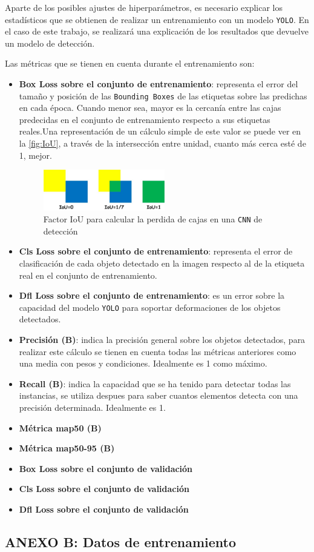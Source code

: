 \clearpage
Aparte de los posibles ajustes de hiperparámetros, es necesario explicar los estadísticos que se obtienen de realizar un entrenamiento con un modelo \texttt{YOLO}. En el caso de este trabajo, se realizará una 
explicación de los resultados que devuelve un modelo de detección.

Las métricas que se tienen en cuenta durante el entrenamiento son:

\begin{itemize}
    \item \textbf{Box Loss sobre el conjunto de entrenamiento}: representa el error del tamaño y posición de las \texttt{Bounding Boxes} de las etiquetas sobre las predichas en cada época. Cuando menor sea, 
    mayor es la cercanía entre las cajas predecidas en el conjunto de entrenamiento respecto a sus etiquetas reales.\newline Una representación de un cálculo simple de este valor se puede ver en la \autoref{fig:IoU}, a través de la 
    intersección entre unidad, cuanto más cerca esté de 1, mejor.

    \begin{figure}[H]
        \centering
        \includegraphics[width=0.5\textwidth]{images/13/a/IoU.png}
        \caption{Factor IoU para calcular la perdida de cajas en una \texttt{CNN} de detección}
        \label{fig:IoU}
    \end{figure}
    \item \textbf{Cls Loss sobre el conjunto de entrenamiento}: representa el error de clasificación de cada objeto detectado en la imagen respecto al de la etiqueta real en el conjunto de entrenamiento.
    \item \textbf{Dfl Loss sobre el conjunto de entrenamiento}: es un error sobre la capacidad del modelo \texttt{YOLO} para soportar deformaciones de los objetos detectados.
    \item \textbf{Precisión (B)}: indica la precisión general sobre los objetos detectados, para realizar este cálculo se tienen en cuenta todas las métricas anteriores como una media con pesos y condiciones. Idealmente es 1 como máximo.
    \item \textbf{Recall (B)}: indica la capacidad que se ha tenido para detectar todas las instancias, se utiliza despues para saber cuantos elementos detecta con una precisión determinada. Idealmente es 1.
    \item \textbf{Métrica \acrshort{map}50 (B)}
    \item \textbf{Métrica \acrshort{map}50-95 (B)}
    \item \textbf{Box Loss sobre el conjunto de validación}
    \item \textbf{Cls Loss sobre el conjunto de validación}
    \item \textbf{Dfl Loss sobre el conjunto de validación}
\end{itemize}

\clearpage
\subsection*{ANEXO B: Datos de entrenamiento}
\label{subsec:B}